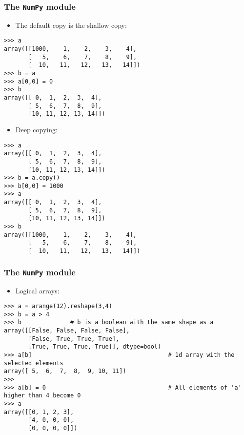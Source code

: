 \documentclass[handout]{beamer}
\numberwithin{equation}{section}
\begin{document}
\begin{frame}[fragile]
\frametitle{The {\tt NumPy} module}
\scriptsize
\begin{itemize}
\item The default copy is the shallow copy:
\end{itemize}

\begin{lstlisting}[name=ex2]
>>> a
array([[1000,    1,    2,    3,    4],
       [   5,    6,    7,    8,    9],
       [  10,   11,   12,   13,   14]])
>>> b = a
>>> a[0,0] = 0
>>> b
array([[ 0,  1,  2,  3,  4],
       [ 5,  6,  7,  8,  9],
       [10, 11, 12, 13, 14]])
\end{lstlisting}

\pause
\begin{itemize}
\item Deep copying:
\end{itemize}

\begin{lstlisting}[name=ex2]
>>> a
array([[ 0,  1,  2,  3,  4],
       [ 5,  6,  7,  8,  9],
       [10, 11, 12, 13, 14]])
>>> b = a.copy()
>>> b[0,0] = 1000
>>> a
array([[ 0,  1,  2,  3,  4],
       [ 5,  6,  7,  8,  9],
       [10, 11, 12, 13, 14]])
>>> b
array([[1000,    1,    2,    3,    4],
       [   5,    6,    7,    8,    9],
       [  10,   11,   12,   13,   14]])
\end{lstlisting}
\end{frame}


\begin{frame}[fragile]
\frametitle{The {\tt NumPy} module}
\begin{itemize}
\item Logical arrays:
\end{itemize}

\begin{lstlisting}[name=ex2]
>>> a = arange(12).reshape(3,4)
>>> b = a > 4
>>> b              # b is a boolean with the same shape as a
array([[False, False, False, False],
       [False, True, True, True],
       [True, True, True, True]], dtype=bool)
>>> a[b]                                       # 1d array with the selected elements
array([ 5,  6,  7,  8,  9, 10, 11])
>>>
>>> a[b] = 0                                   # All elements of 'a' higher than 4 become 0
>>> a
array([[0, 1, 2, 3],
       [4, 0, 0, 0],
       [0, 0, 0, 0]])
\end{lstlisting}
\end{frame}
\end{document}

